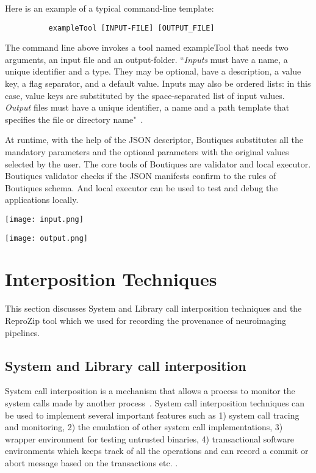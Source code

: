 Here is an example of a typical command-line template:

\begin{verbatim}
          exampleTool [INPUT-FILE] [OUTPUT_FILE]
\end{verbatim}

The command line above invokes a tool named exampleTool that needs two arguments, an input file and an output-folder. ``\textit{Inputs} must have a name, a unique identifier and a type. They may be optional, have a description, a value key, a flag separator, and a default value. Inputs may also be ordered lists: in this case, value keys are substituted by the space-separated list of input values. \textit{Output} files must have a unique identifier, a name and a path template that specifies the file or directory name"~\cite{boutiques}.

At runtime, with the help of the JSON descriptor, Boutiques substitutes all the mandatory parameters and the optional parameters with the original values selected by the user. The core tools of Boutiques are validator and local executor. Boutiques validator checks if the JSON manifests confirm to the rules of Boutiques schema. And local executor can be used to test and debug the applications locally.

\begin{center}
\texttt{[image: input.png]}
\label{fig:input}
\end{center}

\begin{center}
\texttt{[image: output.png]}
\label{fig:output}
\end{center}

\section{Interposition Techniques}\label{Interposition}
This section discusses System and Library call interposition techniques and the ReproZip tool which we used for recording the provenance of neuroimaging pipelines.
\subsection{System and Library call interposition}
System call interposition is a mechanism that allows a process to monitor the system calls made by another process~\cite{Jain00user-levelinfrastructure}. System call interposition techniques can be used to implement several important features such as 1) system call tracing and monitoring, 2) the emulation of other system call implementations, 3) wrapper environment for testing untrusted binaries, 4) transactional software environments which keeps track of all the operations and can record a commit or abort message based on the transactions etc. \cite{Jones93}.


